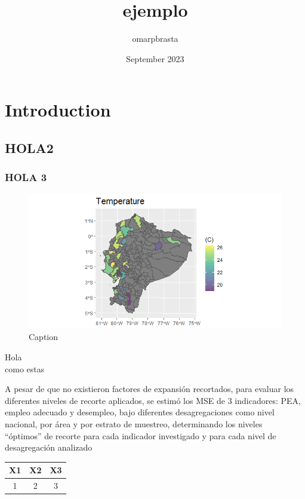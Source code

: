 \documentclass{article}
\begin{document}


\title{ejemplo}
\author{omarpbrasta }
\date{September 2023}

\maketitle

\section{Introduction}
\subsection{HOLA2}
\subsubsection{HOLA 3}

\begin{figure}[h]
    \centering
    \includegraphics{Rplot.png}
    \caption{Caption}
    \label{fig:enter-label}
\end{figure}


Hola \\
como
estas

A pesar de que no existieron factores de expansión recortados, para evaluar los
diferentes niveles de recorte aplicados, se estimó los MSE de 3 indicadores: PEA,
empleo adecuado y desempleo, bajo diferentes desagregaciones como nivel
nacional, por área y por estrato de muestreo, determinando los niveles\\
“óptimos” de recorte para cada indicador investigado y para cada nivel de
desagregación analizado


\begin{tabular}{|c|c|c|}
\hline
X1 & X2 & X3 \\
\hline
1 & 2 & 3 \\
\hline
\end{tabular}
\end{document}
